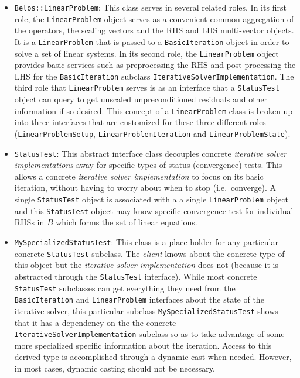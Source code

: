 \documentclass[pdf,ps2pdf,11pt]{SANDreport}
\begin{document}
\begin{itemize}
\item{}\texttt{Belos::LinearProblem}:
This class serves in several related roles.  In its first role, the
{}\texttt{Linear\-Problem} object serves as a convenient common
aggregation of the operators, the scaling vectors and the RHS and LHS
multi-vector objects.  It is a {}\texttt{Linear\-Problem} that is
passed to a {}\texttt{Basic\-Iteration} object in order to solve a set
of linear systems.  In its second role, the {}\texttt{Linear\-Problem}
object provides basic services such as preprocessing the RHS and
post-processing the LHS for the {}\texttt{Basic\-Iteration} subclass
{}\texttt{Iterative\-Solver\-Implementation}.  The third role that
{}\texttt{Linear\-Problem} serves is as an interface that a
{}\texttt{Status\-Test} object can query to get unscaled
unpreconditioned residuals and other information if so desired.  This
concept of a {}\texttt{Linear\-Problem} class is broken up into three
interfaces that are customized for these three different roles
({}\texttt{Linear\-Problem\-Setup},
{}\texttt{Linear\-Problem\-Iteration} and
{}\texttt{Linear\-Problem\-State}).

\item{}\texttt{StatusTest}:
This abstract interface class decouples concrete {}\textit{iterative
solver implementations} away for specific types of status
(convergence) tests.  This allows a concrete {}\textit{iterative
solver implementation} to focus on its basic iteration, without having
to worry about when to stop (i.e.~converge).  A single
{}\texttt{Status\-Test} object is associated with a a single
{}\texttt{Linear\-Problem} object and this {}\texttt{Status\-Test}
object may know specific convergence test for individual RHSs in $B$
which forms the set of linear equations.

\item{}\texttt{MySpecializedStatusTest}:
This class is a place-holder for any particular concrete
{}\texttt{Status\-Test} subclass.  The {}\textit{client} knows about
the concrete type of this object but the {}\textit{iterative solver
implementation} does not (because it is abstracted through the
{}\texttt{StatusTest} interface).  While most concrete
{}\texttt{StatusTest} subclasses can get everything they need from the
{}\texttt{Basic\-Iteration} and {}\texttt{Linear\-Problem} interfaces
about the state of the iterative solver, this particular subclass
{}\texttt{My\-Specialized\-Status\-Test} shows that it has a
dependency on the the concrete
{}\texttt{Iterative\-Solver\-Implementation} subclass so as to take
advantage of some more specialized specific information about the
iteration.  Access to this derived type is accomplished through a
dynamic cast when needed.  However, in most cases, dynamic casting
should not be necessary.

\end{itemize}
\end{document}
